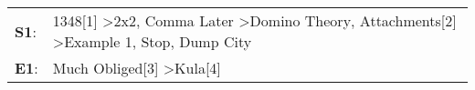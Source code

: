 \begin{supertabular}{p{0.03\textwidth}p{0.92\textwidth}}
 \textbf{S1}:  &  1348[1]\textsuperscript{} \textgreater \enspace 2x2\textsuperscript{}, \enspace Comma Later\textsuperscript{} \textgreater \enspace Domino Theory\textsuperscript{}, \enspace Attachments[2]\textsuperscript{} \textgreater \enspace Example 1\textsuperscript{}, \enspace Stop\textsuperscript{}, \enspace Dump City\textsuperscript{}  \enspace  \\
 \textbf{E1}:  &                                                                                                                                                                                                                                                        Much Obliged[3]\textsuperscript{} \textgreater \enspace Kula[4]\textsuperscript{}  \enspace  \\
\end{supertabular}
